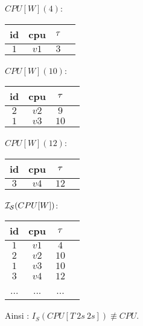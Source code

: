 \begin{example}
\noindent\begin{minipage}[c]{0.24\linewidth}
\begin{center}$CPU[W](4)$: \\ \vspace{1em}
\begin{tabular}{|c|c|c|c|}
\hline
id & cpu & $\tau$ \\
\hline
$1$ & $v1$ & $3$ \\
\hline
\end{tabular}\end{center}
\end{minipage}  %
\begin{minipage}[c]{0.24\linewidth}
\begin{center}$CPU[W](10)$: \\ \vspace{1em}
\begin{tabular}{|c|c|c|c|}
\hline
id & cpu & $\tau$ \\
\hline
$2$ & $v2$ & $9$ \\ \hline
$1$ & $v3$ & $10$ \\ \hline
\end{tabular}\end{center}
\end{minipage} %
\begin{minipage}[c]{0.24\linewidth}
\begin{center}$CPU[W](12)$: \\ \vspace{1em}
\begin{tabular}{|c|c|c|c|}
\hline
id & cpu & $\tau$ \\
\hline
$3$ & $v4$ & $12$ \\ \hline
\end{tabular}\end{center}
\end{minipage} %
\begin{minipage}[c]{0.24\linewidth}
\begin{center}$\mathcal{I_S}(CPU[W])$: \\ \vspace{1em}
\begin{tabular}{|c|c|c|c|} \hline
id & cpu & $\tau$ \\ \hline
$1$ & $v1$ & $4$ \\ \hline
$2$ & $v2$ & $10$ \\ \hline
$1$ & $v3$ & $10$ \\ \hline
$3$ & $v4$ & $12$ \\ \hline
... & ... & ... \\ \hline
\end{tabular}\end{center}
\end{minipage}

Ainsi : $I_S(CPU[T\ 2s\ 2s]) \not\equiv CPU$.
\end{example}

